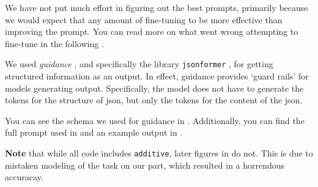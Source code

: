 We have not put much effort in figuring out the best prompts, primarily because we would expect that any amount of fine-tuning to be more effective than improving the prompt. You can read more on what went wrong attempting to fine-tune in the following .

We used \textit{guidance} \cite{guidance_2023}, and specifically the library \texttt{jsonformer} \cite{1rgs_2023}, for getting structured information as an output.
In effect, guidance provides `guard rails' for models generating output.
Specifically, the model does not have to generate the tokens for the structure of json, but only the tokens for the content of the json.


You can see the schema we used for guidance in . Additionally, you can find the full prompt used in  and an example output in .



\textbf{Note} that while all code includes \texttt{additive}, later figures in  do not.
This is due to mistaken modeling of the task on our part, which resulted in a horrendous accuracay. 



